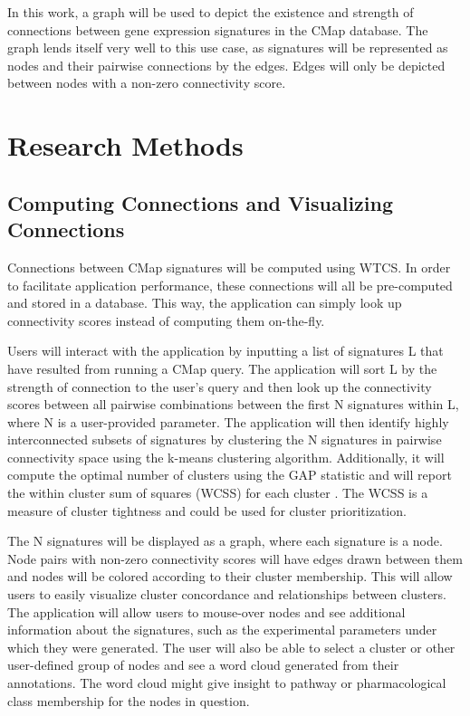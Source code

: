 \documentclass[12pt]{article}
\begin{document}
In this work, a graph will be used to depict the existence and strength of connections between gene expression signatures in the CMap database. The graph lends itself very well to this use case, as signatures will be represented as nodes and their pairwise connections by the edges. Edges will only be depicted between nodes with a non-zero connectivity score. 

\section{Research Methods}
\subsection{Computing Connections and Visualizing Connections}

Connections between CMap signatures will be computed using WTCS. In order to facilitate application performance, these connections will all be pre-computed and stored in a database. This way, the application can simply look up connectivity scores instead of computing them on-the-fly.

Users will interact with the application by inputting a list of signatures L that have resulted from running a CMap query. The application will sort L by the strength of connection to the user's query and then look up the connectivity scores between all pairwise combinations between the first N signatures within L, where N is a user-provided parameter. The application will then identify highly interconnected subsets of signatures by clustering the N signatures in pairwise connectivity space using the k-means clustering algorithm\cite{lloyd_least_squares_1982}. Additionally, it will compute the optimal number of clusters using the GAP statistic and will report the within cluster sum of squares (WCSS) for each cluster \cite{tibshirani_estimating_2001}. The WCSS is a measure of cluster tightness and could be used for cluster prioritization.

The N signatures will be displayed as a graph, where each signature is a node. Node pairs with non-zero connectivity scores will have edges drawn between them and nodes will be colored according to their cluster membership. This will allow users to easily visualize cluster concordance and relationships between clusters. The application will allow users to mouse-over nodes and see additional information about the signatures, such as the experimental parameters under which they were generated. The user will also be able to select a cluster or other user-defined group of nodes and see a word cloud generated from their annotations. The word cloud might give insight to pathway or pharmacological class membership for the nodes in question.
\end{document}
